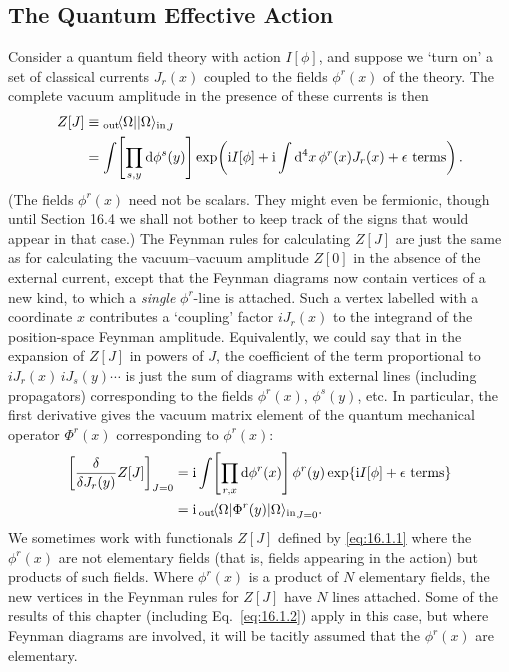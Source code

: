 \subsection{The Quantum Effective Action}
\label{sec:16.1}

Consider a quantum field theory with action $I[\phi]$, and suppose we `turn
on' a set of classical currents $J_r(x)$ coupled to the fields $\phi^r(x)$ of the
theory. The complete vacuum amplitude in the presence of these
currents is then
\begin{align}
Z[J]
&\equiv{{}_{\mathrm{out}}\!\langle \Omega\rvert\lvert \Omega\rangle_{\mathrm{in}}}_J \notag\\
&=\int\!\left[\prod_{s,y}\mathop{}\!\mathrm{d}\phi^s(y)\right]
 \exp\!\left(\mathrm{i} I[\phi]+\mathrm{i}\int \mathop{}\!\mathrm{d}^4x\,\phi^r(x)J_r(x)+\epsilon\text{ terms}\right).
\label{eq:16.1.1}
\end{align}
(The fields $\phi^r(x)$ need not be scalars. They might even be fermionic,
though until Section 16.4 we shall not bother to keep track of the signs
that would appear in that case.) The Feynman rules for calculating $Z[J]$
are just the same as for calculating the vacuum--vacuum amplitude $Z[0]$ in
the absence of the external current, except that the Feynman diagrams now
contain vertices of a new kind, to which a \emph{single} $\phi^r$-line is attached. Such
a vertex labelled with a coordinate $x$ contributes a `coupling' factor $iJ_r(x)$
to the integrand of the position-space Feynman amplitude. Equivalently,
we could say that in the expansion of $Z[J]$ in powers of $J$, the coefficient
of the term proportional to $iJ_r(x)\,iJ_s(y)\cdots$ is just the sum of diagrams
with external lines (including propagators) corresponding to the fields
$\phi^r(x)$, $\phi^s(y)$, etc. In particular, the first derivative gives the vacuum
matrix element of the quantum mechanical operator $\Phi^r(x)$ corresponding
to $\phi^r(x)$:
\begin{align}
\left[\frac{\delta}{\delta J_r(y)}Z[J]\right]_{J=0}
&=\mathrm{i}\int\!\left[\prod_{r,x}\mathop{}\!\mathrm{d}\phi^r(x)\right]
 \phi^r(y)\exp\{\mathrm{i} I[\phi]+\epsilon\text{ terms}\} \notag\\
&=\mathrm{i}\,{}_{\mathrm{out}}\!\langle \Omega\rvert\Phi^r(y){\lvert \Omega\rangle_{\mathrm{in}}}_{J=0}.
\label{eq:16.1.2}
\end{align}
We sometimes work with functionals $Z[J]$ defined by \eqref{eq:16.1.1} where the
$\phi^r(x)$ are not elementary fields (that is, fields appearing in the action) but
products of such fields. Where $\phi^r(x)$ is a product of $N$ elementary fields,
the new vertices in the Feynman rules for $Z[J]$ have $N$ lines attached.
Some of the results of this chapter (including Eq.\ \eqref{eq:16.1.2}) apply in this
case, but where Feynman diagrams are involved, it will be tacitly assumed
that the $\phi^r(x)$ are elementary.

